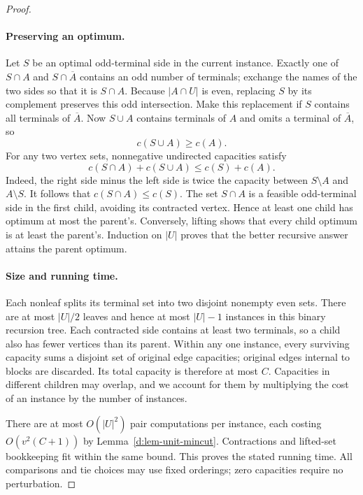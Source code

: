 \begin{proof}
\paragraph{Preserving an optimum.}
Let \(S\) be an optimal odd-terminal side in the current instance.
Exactly one of \(S\cap A\) and \(S\cap\overline A\) contains an odd number
of terminals; exchange the names of the two sides so that it is \(S\cap A\).
Because \(|A\cap U|\) is even, replacing \(S\) by its complement
preserves this odd intersection.  Make this replacement if \(S\)
contains all terminals of \(\overline A\).
Now \(S\cup A\) contains terminals of \(A\) and omits a terminal of
\(\overline A\), so
\[
 c(S\cup A)\ge c(A).
\]
For any two vertex sets, nonnegative undirected capacities satisfy
\begin{equation}
\label{d:eq-cut-submodularity}
 c(S\cap A)+c(S\cup A)\le c(S)+c(A).
\end{equation}
Indeed, the right side minus the left side is twice the capacity
between \(S\setminus A\) and \(A\setminus S\).
It follows that \(c(S\cap A)\le c(S)\).
The set \(S\cap A\) is a feasible odd-terminal side in the first child,
avoiding its contracted vertex.  Hence at least one child has optimum
at most the parent's.  Conversely, lifting shows that every child
optimum is at least the parent's.  Induction on \(|U|\) proves that
the better recursive answer attains the parent optimum.

\paragraph{Size and running time.}
Each nonleaf splits its terminal set into two disjoint nonempty even
sets.  There are at most \(|U|/2\) leaves and hence at most \(|U|-1\)
instances in this binary recursion tree.
Each contracted side contains at least two terminals, so a child
also has fewer vertices than its parent.
Within any one instance, every surviving capacity sums a disjoint
set of original edge capacities; original edges internal to blocks
are discarded.  Its total capacity is therefore at most \(C\).
Capacities in different children may overlap, and we account for them
by multiplying the cost of an instance by the number of instances.

There are at most \(O(|U|^2)\) pair computations per instance,
each costing \(O(v^2(C+1))\) by Lemma~\ref{d:lem-unit-mincut}.
Contractions and lifted-set bookkeeping fit within the same bound.
This proves the stated running time.
All comparisons and tie choices may use fixed orderings; zero
capacities require no perturbation.
\end{proof}

